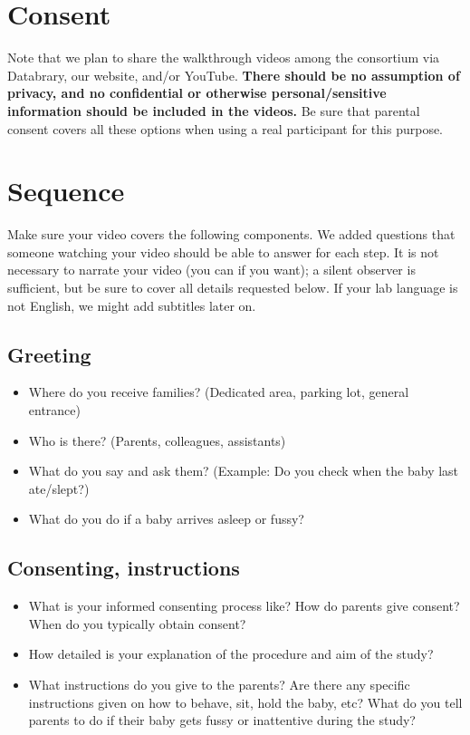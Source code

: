 \documentclass[
  letterpaper,
  DIV=11,
  numbers=noendperiod,
  oneside]{scrreprt}
\providecommand{\tightlist}{%
  \setlength{\itemsep}{0pt}\setlength{\parskip}{0pt}}
\begin{document}
\section{Consent}\label{consent}

Note that we plan to share the walkthrough videos among the consortium
via Databrary, our website, and/or YouTube. \textbf{There should be no
assumption of privacy, and no confidential or otherwise
personal/sensitive information should be included in the videos.} Be
sure that parental consent covers all these options when using a real
participant for this purpose.

\section{Sequence}\label{sequence}

Make sure your video covers the following components. We added questions
that someone watching your video should be able to answer for each step.
It is not necessary to narrate your video (you can if you want); a
silent observer is sufficient, but be sure to cover all details
requested below. If your lab language is not English, we might add
subtitles later on.

\subsection{Greeting}\label{greeting}

\begin{itemize}
\tightlist
\item
  Where do you receive families? (Dedicated area, parking lot, general
  entrance)
\item
  Who is there? (Parents, colleagues, assistants)
\item
  What do you say and ask them? (Example: Do you check when the baby
  last ate/slept?)
\item
  What do you do if a baby arrives asleep or fussy?
\end{itemize}

\subsection{Consenting, instructions}\label{consenting-instructions}

\begin{itemize}
\tightlist
\item
  What is your informed consenting process like? How do parents give
  consent? When do you typically obtain consent?
\item
  How detailed is your explanation of the procedure and aim of the
  study?
\item
  What instructions do you give to the parents? Are there any specific
  instructions given on how to behave, sit, hold the baby, etc? What do
  you tell parents to do if their baby gets fussy or inattentive during
  the study?
\end{itemize}
\end{document}
